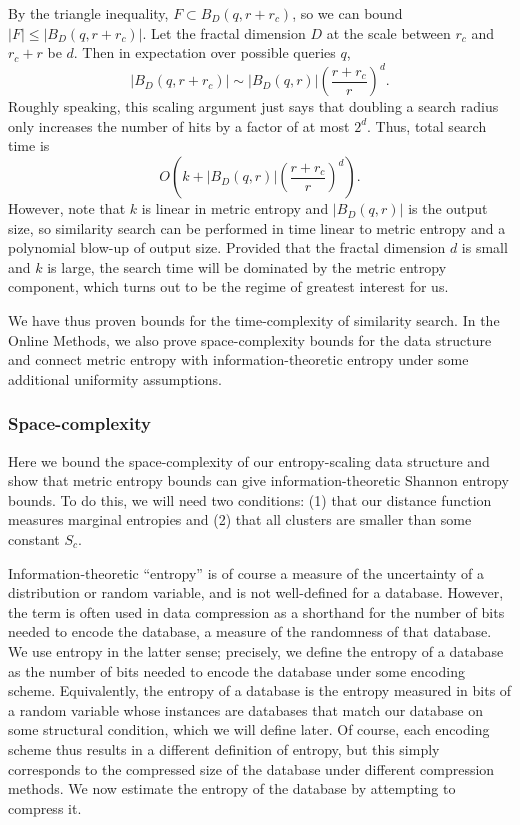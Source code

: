 \documentclass[review,preprint,12pt]{elsarticle}
\theoremstyle{definition}
\theoremstyle{remark}
\numberwithin{equation}{section}
\begin{document}
By the triangle inequality, $F \subset B_D(q,r+r_c)$,
so we can bound $|F| \le |B_D(q,r+r_c)|$.
Let the fractal dimension $D$ at the scale between $r_c$ and $r_c + r$ be $d$.
Then in expectation over possible queries $q$,
\[
    \left|B_D(q, r+r_c)\right| \sim \left|B_D(q,r)\right|\left(\frac{r+r_c}{r}\right)^d .
\]
Roughly speaking, this scaling argument just says that doubling a search radius only increases the number of hits by a factor of at most $2^d$.
Thus, total search time is 
\[
    O\left(k + \left|B_D(q,r)\right|\left(\frac{r+r_c}{r}\right)^d \right).
\]
However, note that $k$ is linear in metric entropy and $|B_D(q,r)|$ is the output size, so similarity search can be performed in time linear to metric entropy and a polynomial blow-up of output size.
Provided that the fractal dimension $d$ is small and $k$ is large, the search time will be dominated by the metric entropy component, which turns out to be the regime of greatest interest for us.

We have thus proven bounds for the time-complexity of similarity search.
In the Online Methods, we also prove space-complexity bounds for the data structure and connect metric entropy with information-theoretic entropy under some additional uniformity assumptions.

\subsubsection{Space-complexity}
Here we bound the space-complexity of our entropy-scaling data structure and show that metric entropy bounds can give information-theoretic Shannon entropy bounds.
To do this, we will need two conditions: (1) that our distance function measures marginal entropies and (2) that all clusters are smaller than some constant $S_c$.

Information-theoretic ``entropy'' is of course a measure of the uncertainty of a distribution or random variable, and is not well-defined for a database.
However, the term is often used in data compression as a shorthand for the number of bits needed to encode the database, a measure of the randomness of that database.
We use entropy in the latter sense; precisely, we define the entropy of a database as the number of bits needed to encode the database under some encoding scheme.
Equivalently, the entropy of a database is the entropy measured in bits of a random variable whose instances are databases that match our database on some structural condition, which we will define later.
Of course, each encoding scheme thus results in a different definition of entropy, but this simply corresponds to the compressed size of the database under different compression methods.
We now estimate the entropy of the database by attempting to compress it.
\end{document}
